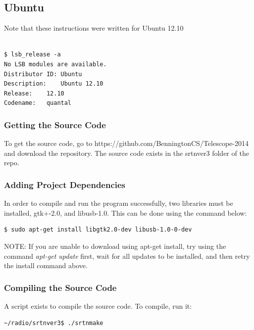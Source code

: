 \documentclass[11pt]{article} %
\begin{document}
\vspace{1cm}
\subsection{Ubuntu}

Note that these instructions were written for Ubuntu 12.10
\\ \\
\begin{lstlisting}[frame=single]
$ lsb_release -a
No LSB modules are available.
Distributor ID: Ubuntu
Description:    Ubuntu 12.10
Release:    12.10
Codename:   quantal
\end{lstlisting}


\vspace{1cm}
\subsubsection{Getting the Source Code}
To get the source code, go to https://github.com/BenningtonCS/Telescope-2014 and download the repository. The source code exists in the srtnver3 folder of the repo.

\vspace{1cm}
\subsubsection{Adding Project Dependencies}
 In order to compile and run the program successfully, two libraries must be installed, gtk+-2.0, and libusb-1.0. This can be done using the command below:

\begin{lstlisting}[frame=single]
$ sudo apt-get install libgtk2.0-dev libusb-1.0-0-dev
\end{lstlisting}

NOTE: If you are unable to download using apt-get install, try using the command \emph{apt-get update} first, wait for all updates to be installed, and then retry the install command above.

\vspace{1cm}
\subsubsection{Compiling the Source Code}
A script exists to compile the source code. To compile, run it:

\begin{lstlisting}[frame=single]
~/radio/srtnver3$ ./srtnmake
\end{lstlisting}
\end{document}
